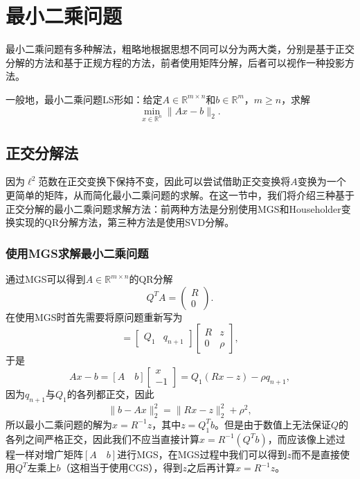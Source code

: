 \documentclass[a4paper,10pt]{ctexart}
\begin{document}
\section{最小二乘问题}
最小二乘问题有多种解法，粗略地根据思想不同可以分为两大类，分别是基于正交分解的方法和基于正规方程的方法，前者使用矩阵分解，后者可以视作一种投影方法。

一般地，最小二乘问题LS形如：给定$ A\in \mathbb{R}^{m\times n} $和$ b\in \mathbb{R}^{m} $，$ m\geqslant n $，求解
\begin{equation}
    \min_{x\in \mathbb{R}^n} \| Ax - b \|_2.
\end{equation}

\subsection{正交分解法}
因为$ \ell^{2} $范数在正交变换下保持不变，因此可以尝试借助正交变换将$ A $变换为一个更简单的矩阵，从而简化最小二乘问题的求解。在这一节中，我们将介绍三种基于正交分解的最小二乘问题求解方法：前两种方法是分别使用MGS和Householder变换实现的QR分解方法，第三种方法是使用SVD分解。

\subsubsection{使用MGS求解最小二乘问题}
通过MGS可以得到$ A\in \mathbb{R}^{m\times n} $的QR分解
\[
    Q^T A = 
    \begin{pmatrix} 
        R \\ 0
    \end{pmatrix}.
\]
在使用MGS时首先需要将原问题重新写为
\begin{equation}
    [A\quad b] = 
    \begin{bmatrix} 
        Q_1 & q_{n+1}
    \end{bmatrix}
    \begin{bmatrix} 
        R & z \\ 0 & \rho
    \end{bmatrix},
\end{equation}
于是
\begin{equation}
    Ax - b = [A\quad b] 
    \begin{bmatrix} 
        x \\ -1
    \end{bmatrix} =
    Q_1(Rx-z) - \rho q_{n+1},
\end{equation}
因为$ q_{n+1} $与$ Q_1 $的各列都正交，因此
\[
    \| b-Ax \|_2^2 = \| Rx-z \|_2^2 + \rho^2,
\]
所以最小二乘问题的解为$ x = R^{-1}z $，其中$ z = Q_1^T b $。但是由于数值上无法保证$ Q $的各列之间严格正交，因此我们不应当直接计算$ x = R^{-1}(Q^T b) $，而应该像上述过程一样对增广矩阵$ [A\quad b] $进行MGS，在MGS过程中我们可以得到$ z $而不是直接使用$ Q^T $左乘上$ b $（这相当于使用CGS），得到$ z $之后再计算$ x = R^{-1}z $。
\end{document}
